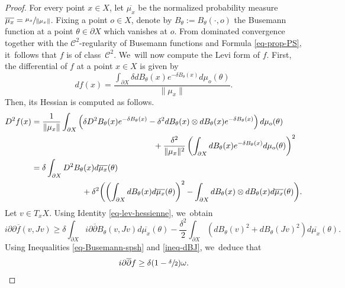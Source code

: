 \documentclass[JEP,XML,SOM,Unicode,NoEqCountersInSection,published]{cedram}
\theoremstyle{definition}
\begin{document}
\begin{proof}
For every point $x\in X$, let $\overline{\mu_x}$ be the normalized probability measure \hbox{$\overline{\mu_x} = \sfrac{\mu_x}{\lVert \mu_x\rVert}$}. Fixing a point $o\in X$, denote by $B_\theta:=B_{\theta}(\cdot,o)$ the Busemann function at a point $\theta\in \partial X$ which vanishes at $o$. From dominated convergence together with the $\mathcal{C}^2$\nobreakdash-regularity of Busemann functions and Formula \eqref{eq-prop-PS}, it~follows that $f$ is of class~$\mathcal{C}^2$. We~will now compute the Levi form of $f$. First, the differential of $f$ at a point $x\in X$ is given by
\begin{equation*}
df(x) = \frac{\int_{\partial X}\delta dB_{\theta}(x)e^{-\delta B_{\theta}(x)}d\mu_o(\theta)}{\lVert \mu_x\rVert}.
\end{equation*}
Then, its Hessian is computed as follows.
\begin{align*}
\begin{split}
D^{2}f(x) &= \frac{1}{\lVert \mu_x\rVert}\int_{\partial X}\left(\delta D^{2}B_{\theta}(x)e^{-\delta B_{\theta}(x)}-\delta^{2}dB_{\theta}(x)\otimes dB_{\theta}(x)e^{-\delta B_{\theta}(x)}\right)d\mu_o(\theta) \\ & \hspace{5.3cm}+ \frac{\delta^{2}}{\lVert \mu_x\rVert^{2}}\left(\int_{\partial X}dB_{\theta}(x)e^{-\delta B_{\theta}(x)}d\mu_o(\theta)\right)^{2}\\
&={\delta}\int_{\partial X}D^{2}B_{\theta}(x)d\overline{\mu_x}(\theta) \\& \hspace{2.2cm}+ {\delta^{2}}\biggl(\left(\int_{\partial X}dB_{\theta}(x)d\overline{\mu_x}(\theta)\right)^{2}-\int_{\partial X}dB_{\theta}(x)\otimes dB_{\theta}(x)d\overline{\mu_x}(\theta)\biggr).
\end{split}
\end{align*}
Let $v\in T_xX$. Using Identity \eqref{eq-lev-hessienne}, we~obtain
\begin{equation*}
i\partial{\partial}\overline{f}(v,Jv) \ge \delta \int_{\partial X}i\partial\overline{\partial}B_{\theta}(v,Jv)d\overline{\mu_x}(\theta) - \frac{\delta^{2}}{2}\int_{\partial X}(dB_{\theta}(v)^{2}+dB_{\theta}(Jv)^{2}) d\overline{\mu_x}(\theta).
\end{equation*}
Using Inequalities \eqref{eq-Busemann-spsh} and \eqref{ineq-dBJ}, we~deduce that
\begin{equation*}
i\partial\overline{\partial}{f} \ge \delta(1-\sfrac{\delta}{2})\omega.\qedhere
\end{equation*}
\end{proof}
\end{document}
